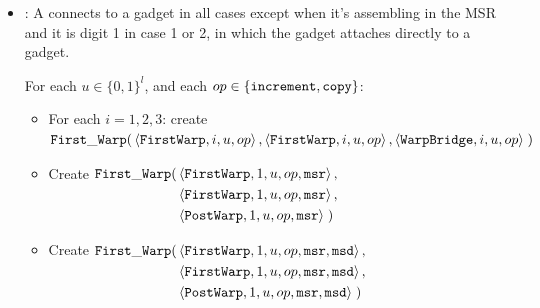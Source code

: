 \begin{itemize}
        \item {\firstwarp}: A {\firstwarp} connects to a {\warpbridge} gadget in all cases except when it's assembling
              in the MSR and it is digit 1 in case 1 or 2, in which the {\firstwarp} gadget attaches directly
              to a {\postwarp} gadget.

              For each $u \in \{0, 1\}^l$, and each $op \in \{ {\tt increment, copy } \}$:
              \begin{itemize}

                \item For each $i = 1,2,3$: create \\
                $\begin{aligned}[t]
                    \firstwarp(& \left\langle {\tt FirstWarp},  i, u, \inc \right\rangle,    %
                                 \left\langle {\tt FirstWarp},  i, u, \inc \right\rangle,    %
                                 \left\langle {\tt WarpBridge}, i, u, \inc \right\rangle \;) %
                \end{aligned}$
                \vspace{.5cm}

                \item Create
                $\begin{aligned}[t]
                    \firstwarp(& \left\langle {\tt FirstWarp}, 1, u, \inc, {\tt msr} \right\rangle, \\ %
                               & \left\langle {\tt FirstWarp}, 1, u, \inc, {\tt msr} \right\rangle, \\ %
                               & \left\langle {\tt PostWarp},  1, u, \inc, {\tt msr} \right\rangle \;) %
                \end{aligned}$
                \vspace{.5cm}

                \item Create
                $\begin{aligned}[t]
                    \firstwarp(& \left\langle {\tt FirstWarp}, 1, u, \inc, {\tt msr}, {\tt msd} \right\rangle, \\ %
                               & \left\langle {\tt FirstWarp}, 1, u, \inc, {\tt msr}, {\tt msd} \right\rangle, \\ %
                               & \left\langle {\tt PostWarp},  1, u, \inc, {\tt msr}, {\tt msd} \right\rangle \;) %
                \end{aligned}$
                \vspace{.5cm}


\end{itemize}
\end{itemize}
